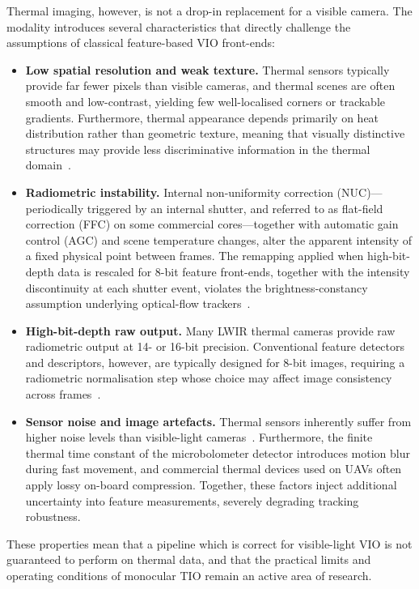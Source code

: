 Thermal imaging, however, is not a drop-in replacement for a visible camera. The modality introduces several characteristics that directly challenge the assumptions of classical feature-based VIO front-ends:
%
\begin{itemize}
  \item \textbf{Low spatial resolution and weak texture.} Thermal sensors typically provide far fewer pixels than visible cameras, and thermal scenes are often smooth and low-contrast, yielding few well-localised corners or trackable gradients. Furthermore, thermal appearance depends primarily on heat distribution rather than geometric texture, meaning that visually distinctive structures may provide less discriminative information in the thermal domain~\cite{Khattak_2019, Vidas_2012}.
  
  \item \textbf{Radiometric instability.} Internal non-uniformity correction (NUC)---periodically triggered by an internal shutter, and referred to as flat-field correction (FFC) on some commercial cores---together with automatic gain control (AGC) and scene temperature changes, alter the apparent intensity of a fixed physical point between frames. The remapping applied when high-bit-depth data is rescaled for 8-bit feature front-ends, together with the intensity discontinuity at each shutter event, violates the brightness-constancy assumption underlying optical-flow trackers~\cite{Vidas_2012}.
  
  \item \textbf{High-bit-depth raw output.} Many LWIR thermal cameras provide raw radiometric output at 14- or 16-bit precision. Conventional feature detectors and descriptors, however, are typically designed for 8-bit images, requiring a radiometric normalisation step whose choice may affect image consistency across frames~\cite{Khattak_2019, Dhrafani_2025}.
  
  \item \textbf{Sensor noise and image artefacts.} Thermal sensors inherently suffer from higher noise levels than visible-light cameras~\cite{Khattak_2019, Dhrafani_2025}. Furthermore, the finite thermal time constant of the microbolometer detector introduces motion blur during fast movement, and commercial thermal devices used on UAVs often apply lossy on-board compression. Together, these factors inject additional uncertainty into feature measurements, severely degrading tracking robustness.
\end{itemize}
%
These properties mean that a pipeline which is correct for visible-light VIO is not guaranteed to perform on thermal data, and that the practical limits and operating conditions of monocular TIO remain an active area of research.

